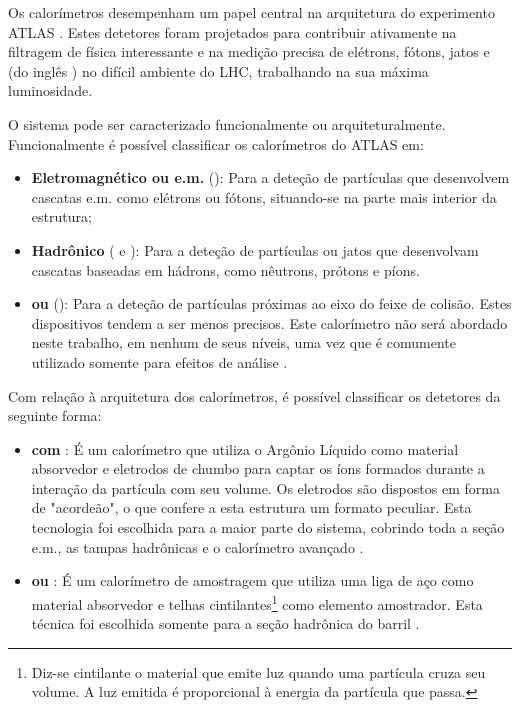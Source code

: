 Os calorímetros desempenham um papel central na arquitetura do experimento
ATLAS \cite{atlas-calo-tpr}. Estes detetores foram projetados para contribuir
ativamente na filtragem de física interessante e na medição precisa de
elétrons, fótons, jatos e  (do inglês
) no difícil ambiente do LHC, trabalhando na sua
máxima luminosidade.

O sistema pode ser caracterizado funcionalmente ou
arquiteturalmente. Funcionalmente é possível classificar os calorímetros do
ATLAS em:

\begin{itemize}
\item \textbf{Eletromagnético ou e.m.} (): Para
a deteção de partículas que desenvolvem cascatas e.m. como elétrons ou fótons,
situando-se na parte mais interior da estrutura;

\item \textbf{Hadrônico} ( e ): Para a deteção de partículas ou jatos que desenvolvam
cascatas baseadas em hádrons, como nêutrons, prótons e píons.

\item \textbf{ ou } (): Para a deteção de partículas próximas ao eixo do feixe de
colisão. Estes dispositivos tendem a ser menos precisos. Este calorímetro não
será abordado neste trabalho, em nenhum de seus níveis, uma vez que é
comumente utilizado somente para efeitos de análise
.
\end{itemize}

Com relação à arquitetura dos calorímetros, é possível classificar os
detetores da seguinte forma:

\begin{itemize}
\item \textbf{ com }: É um
calorímetro que utiliza o Argônio Líquido como material absorvedor e eletrodos
de chumbo para captar os íons formados durante a interação da partícula com
seu volume. Os eletrodos são dispostos em forma de "acordeão", o que confere a
esta estrutura um formato peculiar. Esta tecnologia foi escolhida para a maior
parte do sistema, cobrindo toda a seção e.m., as tampas hadrônicas e o
calorímetro avançado \cite{lar-tdr}.

\item \textbf{ ou }: É um
calorímetro de amostragem que utiliza uma liga de aço como material absorvedor
e telhas cintilantes\footnote{Diz-se cintilante o material que emite luz
quando uma partícula cruza seu volume. A luz emitida é proporcional à energia
da partícula que passa.} como elemento amostrador. Esta técnica foi escolhida
somente para a seção hadrônica do barril \cite{tilecal}.
\end{itemize}

